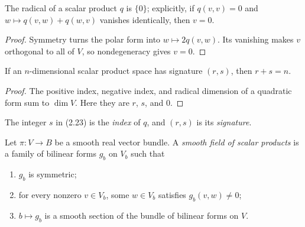 \begin{lemma}
\label{lem:radical-scalar-product-trivial}
\leanok
{}
The radical of a scalar product $q$ is $\{0\}$; explicitly, if $q(v,v)=0$ and
$w\mapsto q(v,w)+q(w,v)$ vanishes identically, then $v=0$.
\end{lemma}

\begin{proof}
\leanok
{}
\sketch Symmetry turns the polar form into $w\mapsto2q(v,w)$. Its vanishing makes
$v$ orthogonal to all of $V$, so nondegeneracy gives $v=0$.
\end{proof}

\begin{corollary}[$r + s = n$, without a basis]
\label{cor:scalar-product-signature-sum}
\leanok
{}
If an $n$-dimensional scalar product space has signature $(r,s)$, then
$r+s=n$.
\end{corollary}

\begin{proof}
\leanok
{}
\sketch The positive index, negative index, and radical dimension of a quadratic
form sum to $\dim V$. Here they are $r$, $s$, and $0$.
\end{proof}

The integer $s$ in (2.23) is the \emph{index} of $q$, and $(r,s)$ is its
\emph{signature}.

\begin{definition}
\label{def:smooth-field-scalar-products}
\leanok
{}
Let $\pi\colon V\to B$ be a smooth real vector bundle. A \emph{smooth field of
scalar products} is a family of bilinear forms $g_b$ on $V_b$ such that
\begin{enumerate}[label=(\alph*)]
\item $g_b$ is symmetric;
\item for every nonzero $v\in V_b$, some $w\in V_b$ satisfies $g_b(v,w)\ne0$;
\item $b\mapsto g_b$ is a smooth section of the bundle of bilinear forms on $V$.
\end{enumerate}
\end{definition}


